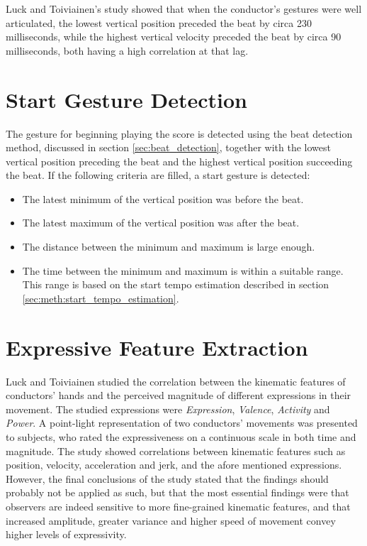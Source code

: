 Luck and Toiviainen's study showed that when the conductor's gestures were well articulated,
the lowest vertical position preceded the beat by circa 230 milliseconds,
while the highest vertical velocity preceded the beat by circa 90 milliseconds,
both having a high correlation at that lag.

\section{Start Gesture Detection}

The gesture for beginning playing the score
is detected using the beat detection method,
discussed in section \ref{sec:beat_detection},
together with the lowest vertical position preceding the beat and
the highest vertical position succeeding the beat.
If the following criteria are filled,
a start gesture is detected:
\begin{itemize}
\item The latest minimum of the vertical position was before the beat.
\item The latest maximum of the vertical position was after the beat.
\item The distance between the minimum and maximum is large enough.
\item The time between the minimum and maximum is within a suitable range.
This range is based on the start tempo estimation described in section
\ref{sec:meth:start_tempo_estimation}.
\end{itemize}

\section{Expressive Feature Extraction}

Luck and Toiviainen \cite{luck2010}
studied the correlation between the kinematic features of conductors' hands
and the perceived magnitude of different expressions in their movement.
The studied expressions were
\textit{Expression}, \textit{Valence}, \textit{Activity} and \textit{Power}.
A point-light representation of two conductors' movements
was presented to subjects, who rated the expressiveness
on a continuous scale in both time and magnitude.
The study showed correlations between kinematic features
such as position, velocity, acceleration and jerk,
and the afore mentioned expressions.
However, the final conclusions of the study stated that
the findings should probably not be applied as such,
but that the most essential findings were that observers
are indeed sensitive to more fine-grained kinematic features,
and that increased amplitude, greater variance and higher speed of movement
convey higher levels of expressivity.

